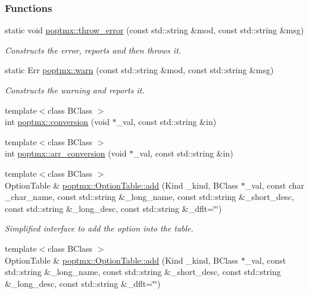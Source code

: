 \subsubsection*{Functions}
\begin{DoxyCompactItemize}
\item 
static void \hyperlink{group__poptmx_gabc3ce676c28bbe04ab3fa50c864606fd}{poptmx::throw\_\-error} (const std::string \&mod, const std::string \&msg)
\begin{DoxyCompactList}\small\item\em Constructs the error, reports and then throws it. \item\end{DoxyCompactList}\item 
static Err \hyperlink{group__poptmx_ga1dd8599eec17744f24e9954da58d8619}{poptmx::warn} (const std::string \&mod, const std::string \&msg)
\begin{DoxyCompactList}\small\item\em Constructs the warning and reports it. \item\end{DoxyCompactList}\item 
{\footnotesize template$<$class BClass $>$ }\\int \hyperlink{group__poptmx_ga4c7b467c5b6d6878847283dbb8187f17}{poptmx::conversion} (void $\ast$\_\-val, const std::string \&in)
\item 
{\footnotesize template$<$class BClass $>$ }\\int \hyperlink{group__poptmx_ga976a5e88a4d9bf16016a878579d860c1}{poptmx::arr\_\-conversion} (void $\ast$\_\-val, const std::string \&in)
\item 
{\footnotesize template$<$class BClass $>$ }\\OptionTable \& \hyperlink{group__poptmx_ga83a8a6d7752c44a0b1d94f32ebd87e04}{poptmx::OptionTable::add} (Kind \_\-kind, BClass $\ast$\_\-val, const char \_\-char\_\-name, const std::string \&\_\-long\_\-name, const std::string \&\_\-short\_\-desc, const std::string \&\_\-long\_\-desc, const std::string \&\_\-dflt=\char`\"{}\char`\"{})
\begin{DoxyCompactList}\small\item\em Simplified interface to add the option into the table. \item\end{DoxyCompactList}\item 
{\footnotesize template$<$class BClass $>$ }\\OptionTable \& \hyperlink{group__poptmx_ga547f3e8c11f99e72f9c503815f9cd25a}{poptmx::OptionTable::add} (Kind \_\-kind, BClass $\ast$\_\-val, const std::string \&\_\-long\_\-name, const std::string \&\_\-short\_\-desc, const std::string \&\_\-long\_\-desc, const std::string \&\_\-dflt=\char`\"{}\char`\"{})

\end{DoxyCompactItemize}

